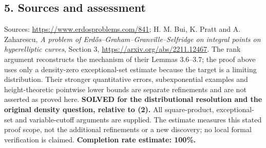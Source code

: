 \subsection*{5. Sources and assessment}
Sources: \url{https://www.erdosproblems.com/841}; H. M. Bui, K. Pratt and A. Zaharescu, \emph{A problem of Erd\H{o}s--Graham--Granville--Selfridge on integral points on hyperelliptic curves}, Section 3, \url{https://arxiv.org/abs/2211.12467}. The rank argument reconstructs the mechanism of their Lemmas 3.6--3.7; the proof above uses only a density-zero exceptional-set estimate because the target is a limiting distribution. Their stronger quantitative errors, subexponential examples and height-theoretic pointwise lower bounds are separate refinements and are not asserted as proved here.
\textbf{SOLVED for the distributional resolution and the original density question, relative to (2).} All square-product, exceptional-set and variable-cutoff arguments are supplied. The estimate measures this stated proof scope, not the additional refinements or a new discovery; no local formal verification is claimed.
\textbf{Completion rate estimate: 100\%.}
